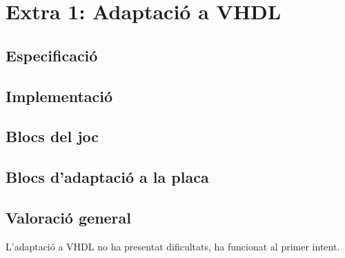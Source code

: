 \chapter{Extra 1: Adaptació a VHDL}

\section{Especificació}


\section{Implementació}


\section{Blocs del joc}

\section{Blocs d'adaptació a la placa}

\section{Valoració general}

L'adaptació a VHDL no ha presentat dificultats, ha funcionat al primer intent.
